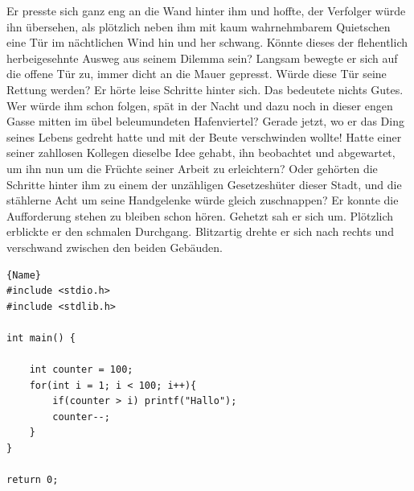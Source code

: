 Er presste sich ganz eng an die Wand hinter ihm und hoffte, der
Verfolger würde ihn übersehen, als plötzlich neben ihm mit kaum
wahrnehmbarem Quietschen eine Tür im nächtlichen Wind hin und her
schwang. Könnte dieses der flehentlich herbeigesehnte Ausweg aus
seinem Dilemma sein? Langsam bewegte er sich auf die offene Tür
zu, immer dicht an die Mauer gepresst. Würde diese Tür seine
Rettung werden? Er hörte leise Schritte hinter sich. Das bedeutete
nichts Gutes. Wer würde ihm schon folgen, spät in der Nacht und
dazu noch in dieser engen Gasse mitten im übel beleumundeten
Hafenviertel? Gerade jetzt, wo er das Ding seines Lebens gedreht
hatte und mit der Beute verschwinden wollte! Hatte einer seiner
zahllosen Kollegen dieselbe Idee gehabt, ihn beobachtet und
abgewartet, um ihn nun um die Früchte seiner Arbeit zu
erleichtern? Oder gehörten die Schritte hinter ihm zu einem der
unzähligen Gesetzeshüter dieser Stadt, und die stählerne Acht um
seine Handgelenke würde gleich zuschnappen? Er konnte die
Aufforderung stehen zu bleiben schon hören. Gehetzt sah er sich
um. Plötzlich erblickte er den schmalen Durchgang. Blitzartig
drehte er sich nach rechts und verschwand zwischen den beiden
Gebäuden.


\begin{lstlisting}[style=C++, caption=Beispielcode]{Name}
#include <stdio.h>
#include <stdlib.h>

int main() {

    int counter = 100;
    for(int i = 1; i < 100; i++){
        if(counter > i) printf("Hallo");
        counter--;
    }
}

return 0;
\end{lstlisting}





